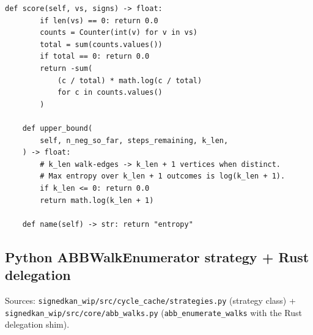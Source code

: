 \documentclass[11pt]{article}
\begin{document}
\begin{lstlisting}[style=pythonstyle]
    def score(self, vs, signs) -> float:
        if len(vs) == 0: return 0.0
        counts = Counter(int(v) for v in vs)
        total = sum(counts.values())
        if total == 0: return 0.0
        return -sum(
            (c / total) * math.log(c / total)
            for c in counts.values()
        )

    def upper_bound(
        self, n_neg_so_far, steps_remaining, k_len,
    ) -> float:
        # k_len walk-edges -> k_len + 1 vertices when distinct.
        # Max entropy over k_len + 1 outcomes is log(k_len + 1).
        if k_len <= 0: return 0.0
        return math.log(k_len + 1)

    def name(self) -> str: return "entropy"
\end{lstlisting}

\subsection{Python ABBWalkEnumerator strategy + Rust delegation}
\label{app:code-abb-walk-strategy}

Sources: \texttt{signedkan\_wip/src/cycle\_cache/strategies.py}
(strategy class) + \texttt{signedkan\_wip/src/core/abb\_walks.py}
(\texttt{abb\_enumerate\_walks} with the Rust delegation shim).
\end{document}
